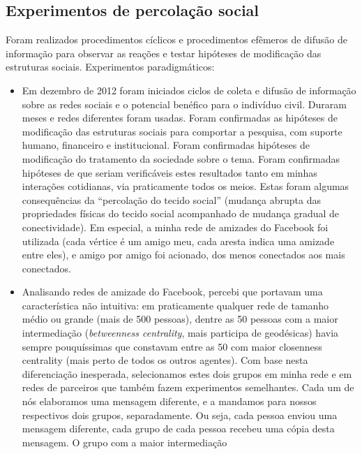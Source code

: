 \documentclass[a4paper,openright,12pt]{report} %
\begin{document}
\subsection{Experimentos de percolação social}\label{sec:exp}
Foram realizados procedimentos cíclicos e procedimentos efêmeros
de difusão de informação para observar as reações
e testar hipóteses de modificação das estruturas sociais.
Experimentos paradigmáticos:
\begin{itemize}
    \item Em dezembro de 2012 foram iniciados ciclos de
        coleta e difusão de informação sobre
        as redes sociais e o potencial benéfico para
        o indivíduo civil. Duraram meses e redes diferentes
        foram usadas. Foram confirmadas 
        as hipóteses de modificação das
        estruturas sociais para comportar a pesquisa,
        com suporte humano, financeiro e institucional.
        Foram confirmadas hipóteses de modificação
        do tratamento da sociedade sobre o tema.
        Foram confirmadas hipóteses de que seriam
        verificáveis estes resultados tanto em minhas
        interações cotidianas, via praticamente todos os meios.
        Estas foram algumas consequências da ``percolação
        do tecido social'' (mudança abrupta das propriedades físicas do tecido social
        acompanhado de mudança gradual de conectividade).
        Em especial, a minha rede de amizades do Facebook
        foi utilizada (cada vértice é um amigo meu,
        cada aresta indica uma amizade entre eles), e
        amigo por amigo foi acionado,
        dos menos conectados aos mais conectados.
    \item Analisando redes de amizade do Facebook, percebi que
        portavam uma característica não intuitiva:
        em praticamente qualquer rede de tamanho médio ou grande
        (mais de 500 pessoas), dentre as 50 pessoas com a
        maior intermediação (\emph{betweenness centrality}, mais participa de geodésicas)
        havia sempre pouquíssimas que constavam entre as 50
        com maior closenness centrality (mais perto de todos os outros agentes). 
        Com base nesta diferenciação inesperada, selecionamos estes dois grupos em minha
        rede e em redes de parceiros que também fazem experimentos semelhantes.
        Cada um de nós elaboramos uma mensagem diferente, e a mandamos
        para nossos respectivos dois grupos, separadamente. Ou seja,
        cada pessoa enviou uma mensagem diferente, cada grupo de cada pessoa
        recebeu uma cópia desta mensagem. O grupo com a maior intermediação

\end{itemize}
\end{document}
